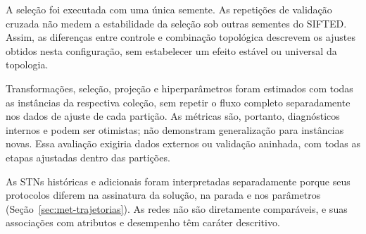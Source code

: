 A seleção foi executada com uma única semente. As repetições de validação
cruzada não medem a estabilidade da seleção sob outras sementes do SIFTED.
Assim, as diferenças entre controle e combinação topológica descrevem os
ajustes obtidos nesta configuração, sem estabelecer um efeito estável
ou universal da topologia.

Transformações, seleção, projeção e hiperparâmetros foram estimados com
todas as instâncias da respectiva coleção, sem repetir o fluxo completo
separadamente nos dados de ajuste de cada partição. As métricas são,
portanto, diagnósticos internos e podem ser otimistas; não demonstram
generalização para instâncias novas. Essa avaliação exigiria dados externos
ou validação aninhada, com todas as etapas ajustadas dentro das partições.

As STNs históricas e adicionais foram interpretadas separadamente porque
seus protocolos diferem na assinatura da solução, na parada e nos parâmetros
(Seção~\ref{sec:met-trajetorias}). As redes não são diretamente comparáveis,
e suas associações com atributos e desempenho têm caráter descritivo.

